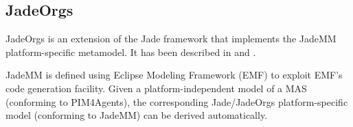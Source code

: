 \subsection{JadeOrgs}

JadeOrgs is an extension of the Jade framework that implements the JadeMM platform-specific metamodel.
It has been described in \cite{Madrigal-Mora08} and \cite{Madrigal-Mora09}.

JadeMM is defined using Eclipse Modeling Framework (EMF) to exploit EMF's code generation facility.
Given a platform-independent model of a MAS (conforming to PIM4Agents), the corresponding Jade/JadeOrgs platform-specific model (conforming to JadeMM) can be derived automatically.